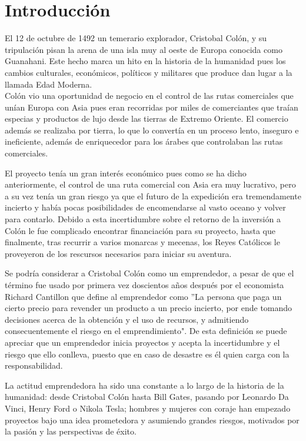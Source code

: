 \chapter{Introducción}

El 12 de octubre de 1492 un temerario explorador, Cristobal Colón, y su tripulación pisan la arena de una isla muy al oeste de Europa conocida como Guanahani. Este hecho marca un hito en la historia de la humanidad pues los cambios culturales, económicos, políticos y militares que produce dan lugar a la llamada Edad Moderna.\\
Colón vio una oportunidad de negocio en el control de las rutas comerciales que unían Europa con Asia pues eran recorridas por miles de comerciantes que traían especias y productos de lujo desde las tierras de Extremo Oriente. El comercio además se realizaba por tierra, lo que lo convertía en un proceso lento, inseguro e ineficiente, además de enriquecedor para los árabes que controlaban las rutas comerciales.

El proyecto tenía un gran interés económico pues como se ha dicho anteriormente, el control de una ruta comercial con Asia era muy lucrativo, pero a su vez tenía un gran riesgo ya que el futuro de la expedición era tremendamente incierto y había pocas posibilidades de encomendarse al vasto oceano y volver para contarlo. Debido a esta incertidumbre sobre el retorno de la inversión a Colón le fue complicado encontrar financiación para su proyecto, hasta que finalmente, tras recurrir a varios monarcas y mecenas,  los Reyes Católicos le proveyeron de los rescursos necesarios para iniciar su aventura.

Se podría considerar a Cristobal Colón como un emprendedor, a pesar de que el término fue usado por primera vez doscientos años después por el economista Richard Cantillon que define al emprendedor como ''La persona que paga un cierto precio para revender un producto a un precio incierto, por ende tomando decisiones acerca de la obtención y el uso de recursos, y admitiendo consecuentemente el riesgo en el emprendimiento". De esta definición se puede apreciar que un emprendedor inicia proyectos y acepta la incertidumbre y el riesgo que ello conlleva, puesto que en caso de desastre es él quien carga con la responsabilidad.

La actitud emprendedora ha sido una constante a lo largo de la historia de la humanidad: desde Cristobal Colón hasta Bill Gates, pasando por Leonardo Da Vinci, Henry Ford o Nikola Tesla; hombres y mujeres con coraje han empezado proyectos bajo una idea prometedora y asumiendo grandes riesgos, motivados por la pasión y las perspectivas de éxito. 

